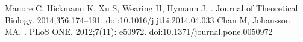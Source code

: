 \documentclass[12pt,leqno]{article}
\begin{document}
\begin{thebibliography}{10}
%
%
%
Manore C, Hickmann K, Xu S, Wearing H, Hymann J.
.
\newblock Journal of Theoretical Biology. 2014;356:174--191.
\newblock doi:10.1016/j.jtbi.2014.04.033
%
%
%
%
%
Chan M, Johansson MA.
.
\newblock PLoS ONE. 2012;7(11): e50972.
\newblock doi:10.1371/journal.pone.0050972
%
%
%
%
%

\end{thebibliography}
\end{document}
